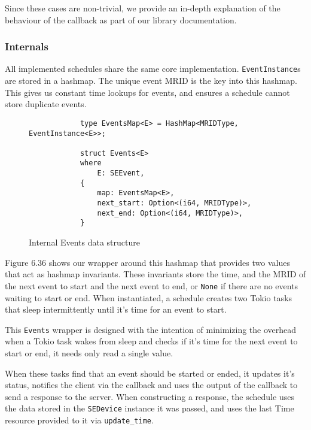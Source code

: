 Since these cases are non-trivial, we provide an in-depth explanation of the behaviour of the callback as part of our library documentation.

\subsubsection{Internals}
All implemented schedules share the same core implementation. \texttt{EventInstance}s are stored in a hashmap. The unique event MRID is the key into this hashmap. This gives us constant time lookups for events, and ensures a schedule cannot store duplicate events.

\begin{figure}[h]
    \begin{center}
        \begin{lstlisting}
            type EventsMap<E> = HashMap<MRIDType, EventInstance<E>>;

            struct Events<E>
            where
                E: SEEvent,
            {
                map: EventsMap<E>,
                next_start: Option<(i64, MRIDType)>,
                next_end: Option<(i64, MRIDType)>,
            }
        \end{lstlisting}
        \label{fig:schedulertrait}
        \vspace{-10pt}
        \caption{Internal Events data structure}
    \end{center}
\end{figure}

Figure 6.36 shows our wrapper around this hashmap that provides two values that act as hashmap invariants. These invariants store the time, and the MRID of the next event to start and the next event to end, or \texttt{None} if there are no events waiting to start or end. When instantiated, a schedule creates two Tokio tasks that sleep intermittently until it's time for an event to start.

This \texttt{Events} wrapper is designed with the intention of minimizing the overhead when a Tokio task wakes from sleep and checks if it's time for the next event to start or end, it needs only read a single value.

When these tasks find that an event should be started or ended, it updates it's status, notifies the client via the callback and uses the output of the callback to send a response to the server. When constructing a response, the schedule uses the data stored in the \texttt{SEDevice} instance it was passed, and uses the last Time resource provided to it via \texttt{update\_time}.

